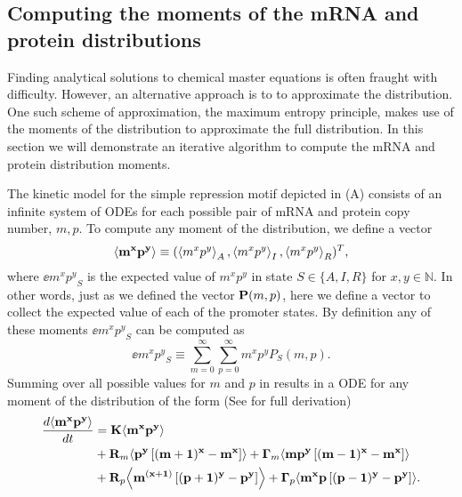 \subsection{Computing the moments of the mRNA and protein distributions}
\label{sec_moments}

Finding analytical solutions to chemical master equations is often fraught with
difficulty. However, an alternative approach is to to approximate the
distribution. One such scheme of approximation, the maximum entropy principle,
makes use of the moments of the distribution to approximate the full
distribution. In this section we will demonstrate an iterative algorithm to
compute the mRNA and protein distribution moments.

The kinetic model for the simple repression motif depicted in
(A) consists of an infinite system of ODEs for each
possible pair of mRNA and protein copy number, $m, p$. To compute any moment of
the distribution, we define a vector
\begin{equation}
	\left\langle \mathbf{m^x p^y} \right\rangle \equiv (\left\langle m^x p^y \right\rangle_A, \left\langle m^x p^y \right\rangle_I, \left\langle m^x p^y \right\rangle_R)^T,
\end{equation}
where $\ee{m^x p^y}_S$ is the expected value of $m^x p^y$ in state $S \in \{A,
I, R\}$ for $x, y \in \mathbb{N}$. In other words, just as we defined the
vector $\mathbf{P}(m, p)$, here we define a vector to collect the expected value of
each of the promoter states. By definition any of these moments $\ee{m^x
p^y}_S$ can be computed as
\begin{equation}
  \ee{m^x p^y}_S \equiv \sum_{m=0}^\infty \sum_{p=0}^\infty m^x p^y P_S(m, p).
  \label{eq_mom_def}
\end{equation}
Summing over all possible values for $m$ and $p$ in 
results in a ODE for any moment of the distribution of the form (See
 for full derivation)
\begin{equation}
  \begin{aligned}
    {d{\mathbf{\left\langle m^x p^y \right\rangle}} \over dt} &=
    \mathbf{K} \mathbf{\left\langle m^x p^y \right\rangle}\\
    &+ \mathbf{R}_m \mathbf{\left\langle p^y \left[ (m + 1)^x -m^x \right] \right\rangle}
     + \mathbf{\Gamma}_m \mathbf{\left\langle m p^y \left[ (m - 1)^x - m^x \right] \right\rangle}\\
    &+ \mathbf{R}_p \mathbf{\left\langle m^{(x + 1)} \left[ (p + 1)^y - p^y \right] \right\rangle}
     + \mathbf{\Gamma}_p \mathbf{\left\langle m^x p \left[ (p - 1)^y - p^y \right] \right\rangle}.
    \label{eq_gral_mom}
  \end{aligned}
\end{equation}


